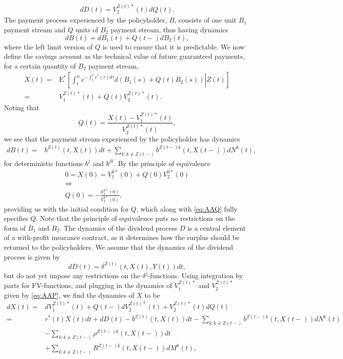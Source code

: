\documentclass[12pt]{article}
\newcommand{\E}{\text{E}}
\theoremstyle{my_thm}
\begin{document}
\begin{align}
dD(t)=V_2^{Z(t)*}(t)dQ(t). \label{eq:AAQ}
\end{align}
The payment process experienced by the policyholder, $B$, consists of one unit $B_1$ payment stream and $Q$ units of $B_2$ payment stream, thus having dynamics
$$
dB(t)=dB_1(t)+ Q(t-)dB_2(t),
$$
where the left limit version of $Q$ is used to ensure that it is predictable. We now define the savings account as the technical value of future guaranteed payments, for a certain quantity of $B_2$ payment stream,
\begin{align*}
X(t)=&\E^*\left[ \left. \int_t^n e^{-\int_t^s r^*(\tau) d\tau} d\left( B_1(s) + Q(t) B_2(s) \right)  \right| Z(t) \right]
\\
=&
V_1^{Z(t)*}(t)+Q(t)V_2^{Z(t)*}(t). 
\end{align*}
Noting that
$$
Q(t)=\frac{X(t)-V_1^{Z(t)*}(t)}{V_2^{Z(t)*}(t)},
$$
we see that the payment stream experienced by the policyholder has dynamics
\begin{align*}
dB(t)%
=&b^{Z(t)}(t,X(t)) dt +\sum_{k:k \neq Z(t-)} b^{Z(t-)k}(t,X(t-))dN^k(t),
\end{align*}
for deterministic functions $b^j$ and $b^{jk}$. By the principle of equivalence
\begin{gather*}
0=X(0)=V_1^{0*}(0)+Q(0)V_2^{0*}(0)
\\
\Leftrightarrow
\\
Q(0)=-\frac{V_1^{0*}(0)}{V_2^{0*}(0)},
\end{gather*}
providing us with the initial condition for $Q$, which along with \eqref{eq:AAQ} fully specifies $Q$. Note that the principle of equivalence puts no restrictions on the form of $B_1$ and $B_2$. The dynamics of the dividend process $D$ is a central element of a with-profit insurance contract, as it determines how the surplus should be returned to the policyholders. We assume that the dynamics of the dividend process is given by
$$
dD(t)=\delta^{Z(t)}(t,X(t),Y(t)) dt,
$$
but do not yet impose any restrictions on the $\delta^j$-functions. Using integration by parts for FV-functions, and plugging in the dynamics of $V_1^{Z(t)*}$ and $V_2^{Z(t)*}$ given by \eqref{eq:AAP}, we find the dynamics of $X$ to be
\begin{align}
dX(t)=&
dV_1^{Z(t)*}(t)+Q(t-)dV_2^{Z(t)*}(t)+V_2^{Z(t)*}(t)dQ(t) \nonumber
\\
=&
r^*(t)X(t)dt
 +dD(t)
 -b^{Z(t)}(t,X(t)) dt
- \sum_{k:k \neq Z(t-)} b^{Z(t-)k}(t,X(t-)) dN^k(t)
\nonumber \\
&- \sum_{k:k \neq Z(t-)} \rho^{Z(t-)k}(t,X(t-))dt
\nonumber \\
&+ \sum_{k:k \neq Z(t-)}  R^{Z(t-)k}(t,X(t-))dM^k(t),\label{eq:AAB}
\end{align}
\end{document}
